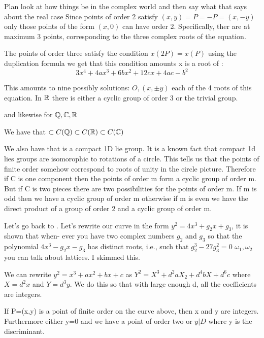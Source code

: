 \documentclass{article}
\begin{document}

Plan look at how things be in the complex world and then say what that says about the real case
Since points of order 2 satisfy $(x, y) = P = -P = (x, -y)$ only those points of the form $(x,0)$ can have order 2. Specifically, ther are at maximum 3 points, corresponding to the three complex roots of the equation. 

The points of order three satisfy the condition $x(2P) = x(P)$ using the duplication formula we get that this condition amounts x is a root of :
$$ 3x^4 + 4ax^3 + 6bx^2 + 12cx +  4ac - b^2 $$

This amounts to nine possibly solutions: $O, (x, \pm y)$ each of the 4 roots of this equation. In $\mathbb{R}$ there is either a cyclic group of order 3 or the trivial group. 

 and likewise for $\mathbb{Q}, \mathbb{C}, \mathbb{R}$

We have that  $\subset C(\mathbb{Q}) \subset C(\mathbb{R}) \subset C(\mathbb{C})$


We also have that  is a compact 1D lie group. It is a known fact that compact 1d lies groups are isomorophic to rotations of a circle. This tells us that the points of finite order somehow correspond to roots of unity in the circle picture. Therefore if C is one component then the points of order m form a cyclic group of order m. But if C is two pieces there are two possibilities for the points of order m. If m is odd then we have a cyclic group of order m otherwise if m is even we have the direct product of a group of order 2 and a cyclic group of order m. 

Let's go back to . Let's rewrite our curve in the form $y^2 = 4x^3 + g_2 x + g_3$, it is shown that when-
ever you have two complex numbers $g_2$ and $g_3$ so that the polynomial $4x^3 - g_2x - g_3$ has distinct roots, i.e., such that $g_2^3 - 27g_3^2 = 0$ $\omega_1 , \omega_2$ you can talk about lattices. I skimmed this. 


We can rewrite $y^2 = x^3 + a x^2 + b x + c $ as $Y^2 = X^3 + d^2 a X_2 + d^4 bX + d^6 c$ where $X = d^2 x$ and $Y = d^3 y$. We do this so that with large enough d, all the coefficients are integers. 

\begin{theorem}
     If P=(x,y) is a point of finite order on the curve above, then x and y are integers. Furthermore either y=0 and we have a point of order two or $y | D$ where y is the discriminant. 
\end{theorem}
\end{document}
